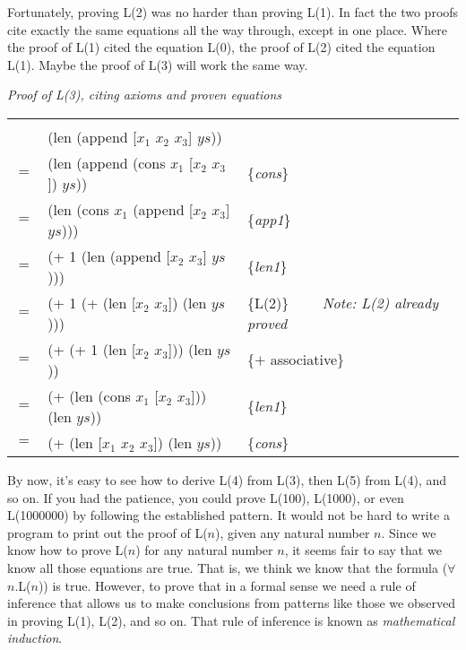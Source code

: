 Fortunately, proving L(2) was no harder than proving L(1).
In fact the two proofs cite exactly the same equations all the way through,
except in one place.
Where the proof of L(1) cited the equation L(0),
the proof of L(2) cited the equation L(1).
Maybe the proof of L(3) will work the same way.

\begin{center}
\emph{Proof of L(3), citing axioms and proven equations}\\
\begin{tabular}{lll}
\hline\\[-1.0em]
    & \textsf{(len (append [$x_1$ $x_2$ $x_3$] $ys$))}         &                     \\
$=$ & \textsf{(len (append (cons $x_1$ [$x_2$ $x_3$]) $ys$))}  & \{\emph{cons}\}     \\
$=$ & \textsf{(len (cons $x_1$ (append [$x_2$ $x_3$] $ys$)))}  & \{\emph{app1}\}     \\
$=$ & \textsf{(+ 1 (len (append [$x_2$ $x_3$] $ys$)))}         & \{\emph{len1}\}     \\
$=$ & \textsf{(+ 1 (+ (len [$x_2$ $x_3$]) (len $ys$)))}        & \{L(2)\} ~~~~\emph{Note: L(2) already proved}\\
$=$ & \textsf{(+ (+ 1 (len [$x_2$ $x_3$])) (len $ys$))}        & \{$+$ associative\} \\
$=$ & \textsf{(+ (len (cons $x_1$ [$x_2$ $x_3$])) (len $ys$))} & \{\emph{len1}\}     \\
$=$ & \textsf{(+ (len [$x_1$ $x_2$ $x_3$]) (len $ys$))}        & \{\emph{cons}\}     \\
\end{tabular}
\end{center}

\label{induction-rationale}
By now, it's easy to see how to derive L(4) from L(3),
then L(5) from L(4), and so on.
If you had the patience, you could prove L(100), L(1000), or even L(1000000)
by following the established pattern.
It would not be hard to write a program to print out the proof of L($n$),
given any natural number $n$.
Since we know how to prove L($n$) for any natural number $n$,
it seems fair to say that we know all those equations are true.
That is, we think we know that the formula ($\forall$$n$.L($n$)) is true.
However, to prove that in a formal sense
we need a rule of inference that allows us to make conclusions
from patterns like those we observed in proving L(1), L(2), and so on.
That rule of inference is known as \emph{mathematical induction}.

